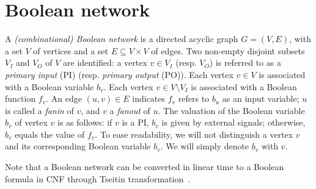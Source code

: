\section{Boolean network}
\label{sect:background-boolean-network}

A \textit{(combinational) Boolean network} is a directed acyclic graph $G=(V,E)$,
with a set $V$ of vertices and a set $E\subseteq V \times V$ of edges.
Two non-empty disjoint subsets $V_I$ and $V_O$ of $V$ are identified:
a vertex $v \in V_I$ (resp. $V_O$) is referred to as a \textit{primary input} (PI) (resp. \textit{primary output} (PO)).
Each vertex $v \in V$ is associated with a Boolean variable $b_v$.
Each vertex $v \in V \setminus V_I$ is associated with a Boolean function $f_v$.
An edge $(u,v)\in E$ indicates $f_v$ refers to $b_u$ as an input variable;
$u$ is called a \textit{fanin} of $v$, and $v$ a \textit{fanout} of $u$.
The valuation of the Boolean variable $b_v$ of vertex $v$ is as follows:
if $v$ is a PI, $b_v$ is given by external signals; otherwise, $b_v$ equals the value of $f_v$.
To ease readability, we will not distinguish a vertex $v$ and its corresponding Boolean variable $b_v$.
We will simply denote $b_v$ with $v$.

Note that a Boolean network can be converted in linear time to a Boolean formula in CNF through Tseitin transformation~\cite{Tseitin1983}.